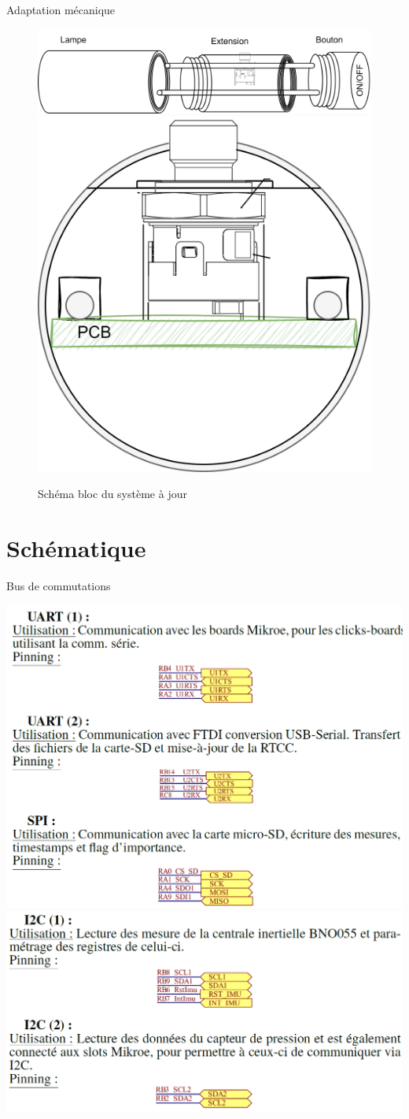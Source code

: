 \documentclass[compress,aspectratio=169]{beamer}
\begin{document}
\begin{frame}[containsverbatim]{Adaptation mécanique}
		\begin{figure}
		\par
		\noindent
		\includegraphics[width=0.7\linewidth]{Images/Dev-SCH/MecaniqueProto2}%
		\hfill
		\includegraphics[width=0.25\linewidth]{Images/Dev-SCH/MecaniqueProto1}%
		\par
		\caption{Schéma bloc du système à jour}
	\end{figure}
\end{frame}

\section{Schématique}

\begin{frame}[containsverbatim]{Bus de commutations}
	 \par
	 \noindent
	 \includegraphics[width=0.49\linewidth]{Images/Dev-SCH/UART12Spi}
	 \hfill
	 \includegraphics[width=0.49\linewidth]{Images/Dev-SCH/I2C1I2C2}
	 \par	 
\end{frame}
\end{document}
